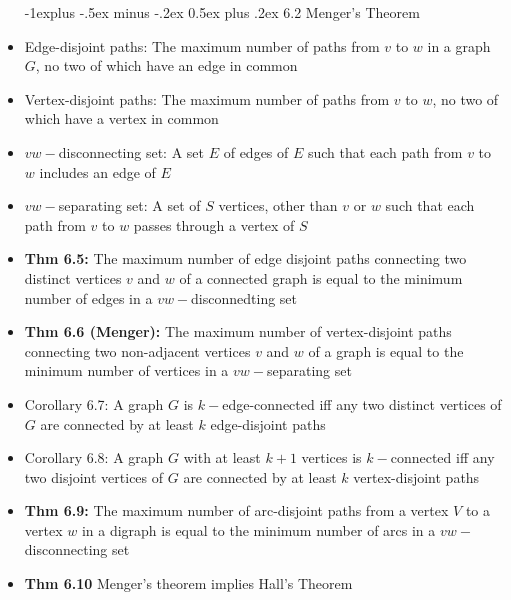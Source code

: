 \documentclass[10pt,landscape]{article}
\makeatletter
\renewcommand{\subsection}{\@startsection{subsection}{2}{0mm}%
                                {-1explus -.5ex minus -.2ex}%
                                {0.5ex plus .2ex}%
                                {\normalfont\normalsize\bfseries}}
\makeatother
\begin{document}
\begin{multicols}{2}
\begin{itemize}
    \subsection{6.2 Menger's Theorem}
    \item Edge-disjoint paths: The maximum number of paths from $v$ to $w$ in a graph $G$, no two of which have an edge in common 
    \item Vertex-disjoint paths: The maximum number of paths from $v$ to $w$, no two of which have a vertex in common
    \item $vw-$disconnecting set: A set $E$ of edges of $E$ such that each path from $v$ to $w$ includes an edge of $E$
    \item $vw-$separating set: A set of $S$ vertices, other than $v$ or $w$ such that each path from $v$ to $w$ passes through a vertex of $S$
    \item \textbf{Thm 6.5:} The maximum number of edge disjoint paths connecting two distinct vertices $v$ and $w$ of a connected graph is equal to the minimum number of edges in a $vw-$disconnedting set 
    \item \textbf{Thm 6.6 (Menger):} The maximum number of vertex-disjoint paths connecting two non-adjacent vertices $v$ and $w$ of a graph is equal to the minimum number of vertices in a $vw-$separating set
    \item Corollary 6.7: A graph $G$ is $k-$edge-connected iff any two distinct vertices of $G$ are connected by at least $k$ edge-disjoint paths
    \item Corollary 6.8: A graph $G$ with at least $k+1$ vertices is $k-$connected iff any two disjoint vertices of $G$ are connected by at least $k$ vertex-disjoint paths
    \item \textbf{Thm 6.9:} The maximum number of arc-disjoint paths from a vertex $V$ to a vertex $w$ in a digraph is equal to the minimum number of arcs in a $vw-$disconnecting set
    \item \textbf{Thm 6.10} Menger's theorem implies Hall's Theorem


\end{itemize}
\end{multicols}
\end{document}

